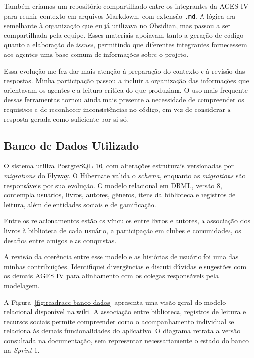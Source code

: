 Também criamos um repositório compartilhado entre os integrantes da \ac{AGES} IV para reunir contexto em arquivos Markdown, com extensão \texttt{.md}. A lógica era semelhante à organização que eu já utilizava no Obsidian, mas passou a ser compartilhada pela equipe. Esses materiais apoiavam tanto a geração de código quanto a elaboração de \textit{issues}, permitindo que diferentes integrantes fornecessem aos agentes uma base comum de informações sobre o projeto.

Essa evolução me fez dar mais atenção à preparação do contexto e à revisão das respostas. Minha participação passou a incluir a organização das informações que orientavam os agentes e a leitura crítica do que produziam. O uso mais frequente dessas ferramentas tornou ainda mais presente a necessidade de compreender os requisitos e de reconhecer inconsistências no código, em vez de considerar a resposta gerada como suficiente por si só.

\subsection{Banco de Dados Utilizado}

O sistema utiliza PostgreSQL 16, com alterações estruturais versionadas por \textit{migrations} do Flyway. O Hibernate valida o \textit{schema}, enquanto as \textit{migrations} são responsáveis por sua evolução. O modelo relacional em \ac{DBML}, versão 8, contempla usuários, livros, autores, gêneros, itens da biblioteca e registros de leitura, além de entidades sociais e de gamificação.

Entre os relacionamentos estão os vínculos entre livros e autores, a associação dos livros à biblioteca de cada usuário, a participação em clubes e comunidades, os desafios entre amigos e as conquistas.

A revisão da coerência entre esse modelo e as histórias de usuário foi uma das minhas contribuições. Identifiquei divergências e discuti dúvidas e sugestões com os demais \ac{AGES} IV para alinhamento com os colegas responsáveis pela modelagem.

A Figura~\ref{fig:readrace-banco-dados} apresenta uma visão geral do modelo relacional disponível na wiki. A associação entre biblioteca, registros de leitura e recursos sociais permite compreender como o acompanhamento individual se relaciona às demais funcionalidades do aplicativo. O diagrama retrata a versão consultada na documentação, sem representar necessariamente o estado do banco na \textit{Sprint} 1.

